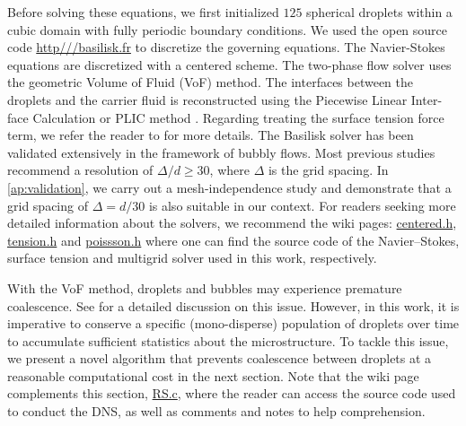 Before solving these equations, we first initialized $125$ spherical droplets within a cubic domain with fully periodic boundary conditions. 
We used the open source code \url{http///basilisk.fr} to discretize the governing equations. 
The Navier-Stokes equations are discretized with a centered scheme.
The two-phase flow solver uses the geometric Volume of Fluid (VoF) method. 
The interfaces between the droplets and the carrier fluid is reconstructed using the Piecewise Linear Inter-face Calculation or PLIC method \citet[Chapter 5.]{tryggvason2011direct}.
Regarding treating the surface tension force term, we refer the reader to \citet{popinet2018numerical} for more details. 
The Basilisk solver has been validated extensively in the framework of bubbly flows. 
Most previous studies \citep{hidman2023assessing,innocenti2020direct} recommend a resolution of $\Delta/d \ge  30$, where $\Delta$ is the grid spacing. 
In \ref{ap:validation}, we carry out a mesh-independence study and demonstrate that a grid spacing of $\Delta = d/30$ is also suitable in our context.
For readers seeking more detailed information about the solvers, we recommend the wiki pages: \href{http://basilisk.fr/src/navier-stokes/centered.h}{centered.h}, \href{http://basilisk.fr/src/tension.h}{tension.h} and \href{http://basilisk.fr/src/poissson.h}{poissson.h} where one can find the source code of the Navier--Stokes, surface tension and multigrid solver used in this work, respectively. 

With the VoF method, droplets and bubbles may experience premature coalescence.
See \citet[Appendix B]{innocenti2020direct} for a detailed discussion on this issue.
However, in this work, it is imperative to conserve a specific (mono-disperse) population of droplets over time to accumulate sufficient statistics about the microstructure.
To tackle this issue, we present a novel algorithm that prevents coalescence between droplets at a reasonable computational cost in the next section. Note that the wiki page complements this section, \href{http://basilisk.fr/sandbox/fintzin/Rising-Suspension/RS.c}{RS.c}, where the reader can access the source code used to conduct the DNS, as well as comments and notes to help comprehension. 




